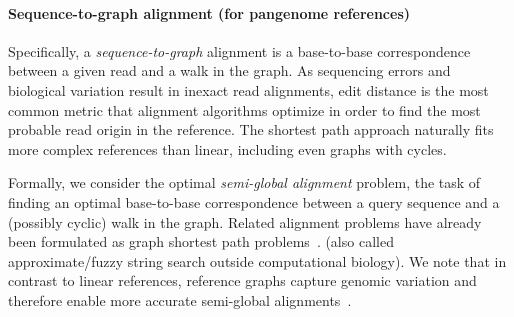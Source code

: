 \paragraph{Sequence-to-graph alignment (for pangenome references)}
Specifically, a \emph{sequence-to-graph} alignment is a base-to-base
correspondence between a given read and a walk in the graph. As sequencing
errors and biological variation result in inexact read alignments, edit distance
is the most common metric that alignment algorithms optimize in order to find
the most probable read origin in the reference. The shortest path approach
naturally fits more complex references than linear, including even graphs with
cycles.

Formally, we consider the optimal \emph{semi-global alignment} problem,
the task of finding an optimal base-to-base correspondence between a query
sequence and a (possibly cyclic) walk in the graph. Related alignment problems
have already been formulated as graph shortest path
problems~\cite{jain_complexity_2019}.
 (also called approximate/fuzzy string search outside computational
biology).
We note that in contrast to linear references, reference graphs capture genomic
variation and therefore enable more accurate semi-global
alignments~\citep{garrison_variation_2018}.
